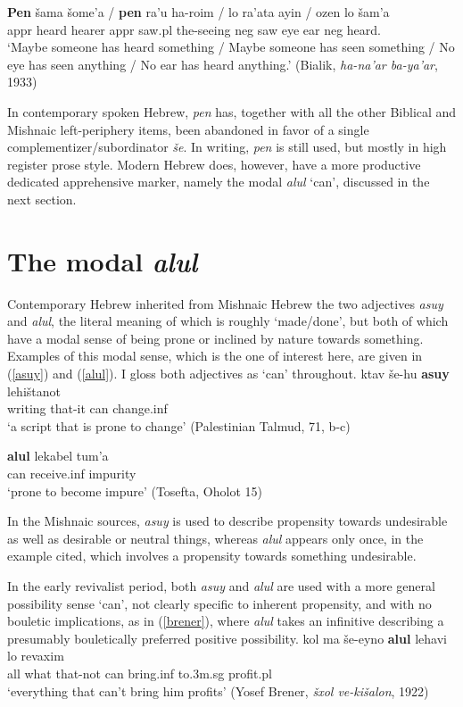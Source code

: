 \documentclass[output=paper,colorlinks,citecolor=brown]{langscibook}
\begin{document}
\ea
\label{bialik}
\gll  \textbf{Pen} {šama} šome'a /  \textbf{pen} ra'u ha-roim / lo ra'ata ayin / ozen lo šam'a \\
 {\sc appr} heard hearer \phantom{/} {\sc appr} saw.{\sc pl} the-seeing \phantom{/} {\sc neg} saw eye \phantom{/} ear {\sc neg} heard. \\
\glt  `Maybe someone has heard something / Maybe someone has seen something  / No eye has seen anything / No ear  has heard anything.'  (Bialik, \textit{ha-na'ar ba-ya'ar}, 1933)
\z
 
In contemporary spoken Hebrew, \textit{pen} has, together with all the other Biblical and Mishnaic left-periphery items, been abandoned in favor of a single complementizer/subordinator \textit{še}. In writing, \textit{pen} is still used, but mostly in high register prose style. Modern Hebrew  does, however, have a more productive dedicated apprehensive marker, namely the modal \textit{alul} `can', discussed in the next section.

\section{The modal \textit{alul}}
\label{sec:alul}
Contemporary Hebrew inherited from Mishnaic Hebrew the two adjectives \textit{asuy} and \textit{alul}, the literal meaning of which is roughly `made/done', but both of which have a modal sense of being prone or inclined by nature towards something. Examples of this modal sense, which is the one of interest here, are given in (\ref{asuy}) and (\ref{alul}). I gloss both adjectives as `can' throughout. 
\ea
\label{asuy}
\gll ktav še-hu \textbf{asuy} lehištanot  \\
writing that-it can change.{\sc inf} \\
\glt `a script that is prone to change' (Palestinian Talmud, 71, b-c)
\z

\ea
\label{alul}
\gll \textbf{alul} lekabel tum'a  \\
 can receive.{\sc inf} impurity  \\
\glt `prone to become impure' (Tosefta, Oholot 15)
\z

 In the Mishnaic sources, \textit{asuy} is used to describe propensity towards undesirable as well as desirable or neutral things, whereas \textit{alul} appears only once, in the example cited, which involves a propensity towards something undesirable. 

In the early revivalist period, both \textit{asuy} and \textit{alul} are used with a more general possibility sense `can', not clearly specific to inherent propensity, and with no bouletic implications, as in (\ref{brener}), where \textit{alul} takes an infinitive describing a presumably bouletically preferred positive possibility.  
\ea
\label{brener}
\gll kol ma še-eyno \textbf{alul} lehavi lo revaxim \\
all what that-not can bring.{\sc inf} to.{\sc 3m.sg} profit.{\sc pl} \\
\glt `everything that can't bring him profits' (Yosef Brener, \textit{šxol ve-kišalon}, 1922)
\z
\end{document}

